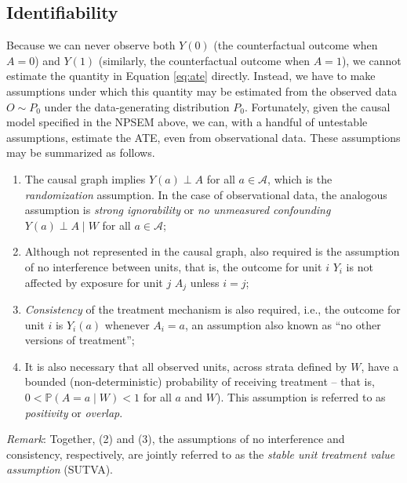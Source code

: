 \documentclass[12pt, krantz2,]{book}
\providecommand{\tightlist}{%
  \setlength{\itemsep}{0pt}\setlength{\parskip}{0pt}}
\theoremstyle{definition}
\theoremstyle{definition}
\theoremstyle{definition}
\newcommand{\1}{\mathbbm{1}}
\begin{document}
\hypertarget{identifiability}{%
\subsection*{Identifiability}\label{identifiability}}


Because we can never observe both \(Y(0)\) (the counterfactual outcome when \(A=0\))
and \(Y(1)\) (similarly, the counterfactual outcome when \(A=1\)), we cannot
estimate the quantity in Equation \eqref{eq:ate} directly. Instead, we have to
make assumptions under which this quantity may be estimated from the observed
data \(O \sim P_0\) under the data-generating distribution \(P_0\). Fortunately,
given the causal model specified in the NPSEM above, we can, with a handful of
untestable assumptions, estimate the ATE, even from observational data. These
assumptions may be summarized as follows.

\begin{enumerate}
\def\labelenumi{\arabic{enumi}.}
\tightlist
\item
  The causal graph implies \(Y(a) \perp A\) for all \(a \in \mathcal{A}\), which
  is the \emph{randomization} assumption. In the case of observational data, the
  analogous assumption is \emph{strong ignorability} or \emph{no unmeasured confounding}
  \(Y(a) \perp A \mid W\) for all \(a \in \mathcal{A}\);
\item
  Although not represented in the causal graph, also required is the assumption
  of no interference between units, that is, the outcome for unit \(i\) \(Y_i\) is
  not affected by exposure for unit \(j\) \(A_j\) unless \(i=j\);
\item
  \emph{Consistency} of the treatment mechanism is also required, i.e., the outcome
  for unit \(i\) is \(Y_i(a)\) whenever \(A_i = a\), an assumption also known as ``no
  other versions of treatment'';
\item
  It is also necessary that all observed units, across strata defined by \(W\),
  have a bounded (non-deterministic) probability of receiving treatment --
  that is, \(0 < \mathbb{P}(A = a \mid W) < 1\) for all \(a\) and \(W\)). This assumption
  is referred to as \emph{positivity} or \emph{overlap}.
\end{enumerate}

\emph{Remark}: Together, (2) and (3), the assumptions of no interference and
consistency, respectively, are jointly referred to as the \emph{stable unit
treatment value assumption} (SUTVA).
\end{document}
